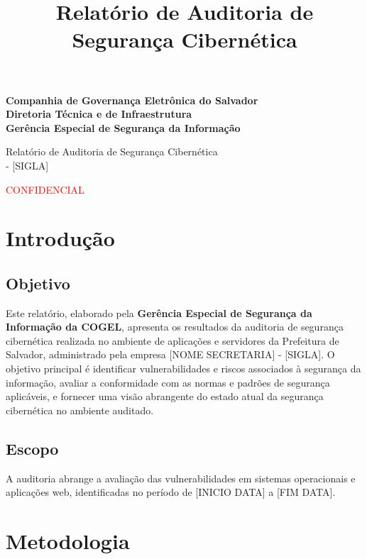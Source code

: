 \documentclass[a4paper,12pt]{article}
\title{Relatório de Auditoria de Segurança Cibernética}
\author{}
\date{}
\begin{document}
\begin{center}
    \large{\textbf{Companhia de Governança Eletrônica do Salvador\\
Diretoria Técnica e de Infraestrutura\\
Gerência Especial de Segurança da Informação\\
}}

\vspace{7cm}

\Large{Relatório de Auditoria de Segurança Cibernética\\
[NOME SECRETARIA] - [SIGLA]}

\vspace{4cm}
\textcolor{red}{CONFIDENCIAL}
\end{center}
\newpage

\tableofcontents  %


\newpage

\section{Introdução}
\subsection{Objetivo}
Este relatório, elaborado pela \textbf{Gerência Especial de Segurança da Informação da COGEL}, apresenta os resultados da auditoria de segurança cibernética realizada no ambiente de aplicações e servidores da Prefeitura de Salvador, administrado pela empresa [NOME SECRETARIA] - [SIGLA]. O objetivo principal é identificar vulnerabilidades e riscos associados à segurança da informação, avaliar a conformidade com as normas e padrões de segurança aplicáveis, e fornecer uma visão abrangente do estado atual da segurança cibernética no ambiente auditado.

\subsection{Escopo}
A auditoria abrange a avaliação das vulnerabilidades em sistemas operacionais e aplicações web, identificadas no período de [INICIO DATA] a [FIM DATA].

\section{Metodologia}
\end{document}
